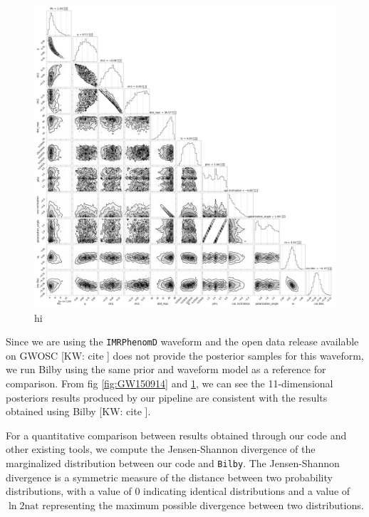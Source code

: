 \documentclass[twocolumn]{aastex631}
\newcommand{\kw}[1]{{\color{rb4}[KW: #1 ]}}
\begin{document}
\begin{figure}
\includegraphics[width=0.99\linewidth]{static/GW170817.png}
\caption{
    hi
}
\label{fig:GW170817}
\end{figure}

Since we are using the \texttt{IMRPhenomD} waveform and the open data release
available on GWOSC \kw{cite} does not provide the posterior samples for this
waveform, we run Bilby using the same prior and waveform model as a reference
for comparison. From fig \ref{fig:GW150914} and \ref{fig:GW170817}, we can see
the 11-dimensional posteriors results produced by our pipeline are consistent
with the results obtained using Bilby \kw{cite}.


For a quantitative comparison between results obtained through our code and
other existing tools, we compute the Jensen-Shannon divergence of the
marginalized distribution between our code and \texttt{Bilby}. The
Jensen-Shannon divergence is a symmetric measure of the distance between two
probability distributions, with a value of 0 indicating identical distributions
and a value of $\ln{2} \textrm{nat}$ representing the maximum possible
divergence between two distributions.
\end{document}
